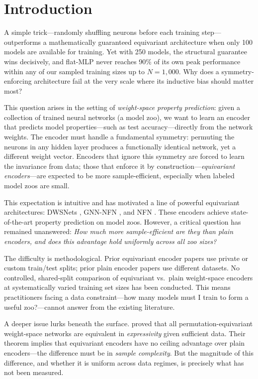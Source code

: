 \section{Introduction}

A simple trick---randomly shuffling neurons before each training step---outperforms a mathematically guaranteed equivariant architecture when only 100 models are available for training. Yet with 250 models, the structural guarantee wins decisively, and flat-MLP never reaches 90\% of its own peak performance within any of our sampled training sizes up to $N{=}1{,}000$. Why does a symmetry-enforcing architecture fail at the very scale where its inductive bias should matter most?

This question arises in the setting of \emph{weight-space property prediction}: given a collection of trained neural networks (a model zoo), we want to learn an encoder that predicts model properties---such as test accuracy---directly from the network weights. The encoder must handle a fundamental symmetry: permuting the neurons in any hidden layer produces a functionally identical network, yet a different weight vector. Encoders that ignore this symmetry are forced to learn the invariance from data; those that enforce it by construction---\emph{equivariant encoders}---are expected to be more sample-efficient, especially when labeled model zoos are small.

This expectation is intuitive and has motivated a line of powerful equivariant architectures: DWSNets \cite{Navon2023Equivariant}, GNN-NFN \cite{Kofinas2024Graph}, and NFN \cite{Zhou2023Permutation}. These encoders achieve state-of-the-art property prediction on model zoos. However, a critical question has remained unanswered: \emph{How much more sample-efficient are they than plain encoders, and does this advantage hold uniformly across all zoo sizes?}

The difficulty is methodological. Prior equivariant encoder papers use private or custom train/test splits; prior plain encoder papers use different datasets. No controlled, shared-split comparison of equivariant vs.\ plain weight-space encoders at systematically varied training set sizes has been conducted. This means practitioners facing a data constraint---how many models must I train to form a useful zoo?---cannot answer from the existing literature.

A deeper issue lurks beneath the surface. \citet{Dayan2026Expressive} proved that all permutation-equivariant weight-space networks are equivalent in \emph{expressivity} given sufficient data. Their theorem implies that equivariant encoders have no ceiling advantage over plain encoders---the difference must be in \emph{sample complexity}. But the magnitude of this difference, and whether it is uniform across data regimes, is precisely what has not been measured.

